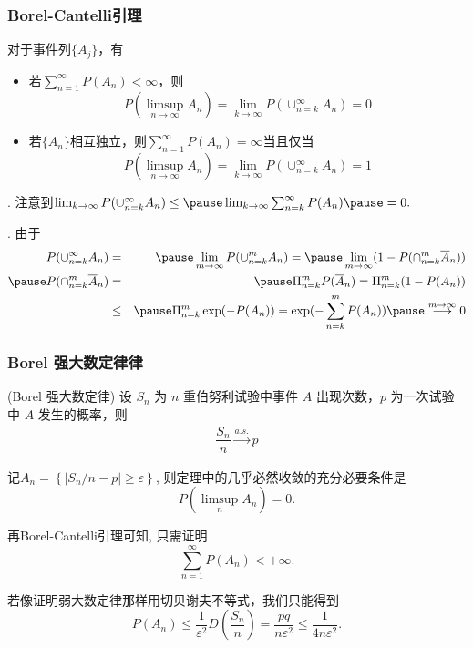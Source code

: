 \documentclass[Prob-All.tex]{subfiles}
\begin{document}
\begin{frame}
	\frametitle{Borel-Cantelli引理}
	\begin{thm}
	  对于事件列$\{A_j\}$，有
	  \begin{itemize}[<+-|alert@+>]
	  \item 若$\sum_{n=1}^\infty P(A_n)<\infty$，则
	  \[P(\limsup_{n\rightarrow\infty}A_n)=\lim_{k\rightarrow\infty}P(\cup_{n=k}^\infty A_n)=0\]
	  \item 若$\{A_n\}$相互独立，则$\sum_{n=1}^\infty P(A_n)=\infty$当且仅当
	  \[P(\limsup_{n\rightarrow\infty}A_n)=\lim_{k\rightarrow\infty}P(\cup_{n=k}^\infty A_n)=1\]
	  \end{itemize}
	\end{thm}\pause
	. 注意到$\lim_{k\rightarrow\infty}P(\cup_{n=k}^\infty A_n)\le \pause \lim_{k\rightarrow\infty}\sum_{n=k}^\infty P(A_n)\pause =0.$

	. 由于\pause
	\begin{eqnarray*}
	  P(\cup_{n=k}^\infty A_n)&=&\pause \lim_{m\rightarrow\infty}P(\cup_{n=k}^m A_n)=\pause \lim_{m\rightarrow\infty}(1-P(\cap_{n=k}^m\overline{A}_n))\\\pause
	  P(\cap_{n=k}^m\overline{A}_n)&=&\pause \Pi_{n=k}^m P(\overline{A}_n)=\Pi_{n=k}^m(1-P(A_n))\\
	  &\le&\pause \Pi_{n=k}^m \exp(-P(A_n))=\exp(-\sum_{n=k}^m P(A_n))\pause \stackrel{m\rightarrow\infty}{\longrightarrow} 0
	\end{eqnarray*}

  \end{frame}

\begin{frame}
	\frametitle{{\rm Borel} 强大数定律律}
	\begin{thm}({\rm Borel} 强大数定律)
		设 $S_n$ 为 $n$ 重伯努利试验中事件 $A$ 出现次数，$p$ 为一次试验中 $A$ 发生的概率，则
		\begin{eqnarray*}
			\dfrac{S_n}{n}\stackrel{a.s.}{\rightarrow} p
		\end{eqnarray*}
	\end{thm}

\pause

\fenxi 记${A_{n}=\left\{\left|S_n / n-p\right| \geq \varepsilon\right\}}$, 则定理中的几乎必然收敛的充分必要条件是\pause %
\[
P\left(\limsup_{n} A_{n}\right)=0.
\]

再Borel-Cantelli引理可知, 只需证明\pause
\[
\sum_{n=1}^{\infty} P\left(A_{n}\right)<+\infty.
\]

\pause
若像证明弱大数定律那样用切贝谢夫不等式，我们只能得到
\[
P\left(A_{n}\right) \leq \frac{1}{\varepsilon^{2}} D\left(\frac{S_n}{n}\right)=\frac{p q}{n \varepsilon^{2}} \leq \frac{1}{4 n \varepsilon^{2}} .
\]

\end{frame}
\end{document}
